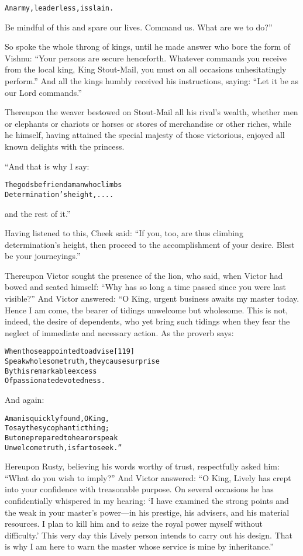 \documentclass{article}
\renewenvironment{verbatim}{\begin{alltt}\normalfont\begin{centering}}{\end{centering}\end{alltt}}
\begin{document}
\begin{verbatim}
An army, leaderless, is slain.
\end{verbatim}
Be mindful of this and spare our lives. Command us. What are we to
do?”

So spoke the whole throng of kings, until he made answer who bore
the form of Vishnu:
``Your persons are secure henceforth. Whatever commands you receive from the local king, King Stout-Mail, you must on all occasions unhesitatingly perform.''
And all the kings humbly received his instructions, saying:
``Let it be as our Lord commands.''

Thereupon the weaver bestowed on Stout-Mail all his rival's wealth,
whether men or elephants or chariots or horses or stores of
merchandise or other riches, while he himself, having attained the
special majesty of those victorious, enjoyed all known delights
with the princess.

“And that is why I say:

\begin{verbatim}
The gods befriend a man who climbs
    Determination's height, ....
\end{verbatim}
and the rest of it.”

Having listened to this, Cheek said:
``If you, too, are thus climbing determination's height, then proceed to the accomplishment of your desire. Blest be your journeyings.''

Thereupon Victor sought the presence of the lion, who said, when
Victor had bowed and seated himself:
``Why has so long a time passed since you were last visible?'' And
Victor answered: “O King, urgent business awaits my master today.
Hence I am come, the bearer of tidings unwelcome but wholesome.
This is not, indeed, the desire of dependents, who yet bring such
tidings when they fear the neglect of immediate and necessary
action. As the proverb says:

\begin{verbatim}
When those appointed to advise                          [119]
Speak wholesome truth, they cause surprise
By this remarkable excess
Of passionate devotedness.
\end{verbatim}
And again:

\begin{verbatim}
A man is quickly found, O King,
To say the sycophantic thing;
But one prepared to hear or speak
Unwelcome truth, is far to seek.”
\end{verbatim}
Hereupon Rusty, believing his words worthy of trust, respectfully
asked him: ``What do you wish to imply?'' And Victor answered:
``O King, Lively has crept into your confidence with treasonable purpose. On several occasions he has confidentially whispered in my hearing: `I have examined the strong points and the weak in your master's power---in his prestige, his advisers, and his material resources. I plan to kill him and to seize the royal power myself without difficulty.' This very day this Lively person intends to carry out his design. That is why I am here to warn the master whose service is mine by inheritance.''
\end{document}
